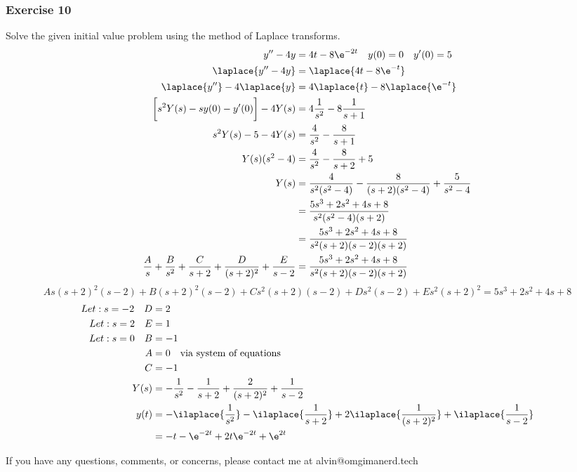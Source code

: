 \documentclass{math}
\begin{document}
\subsubsection*{Exercise 10}
Solve the given initial value problem using the method of Laplace transforms.
\begin{align*}
  y''-4y &= 4t-8\e^{-2t} \quad y(0) = 0 \quad y'(0) = 5 \\
  \laplace{y''-4y} &= \laplace{4t-8\e^{-t}} \\
  \laplace{y''}-4\laplace{y} &= 4\laplace{t}-8\laplace{\e^{-t}} \\
  \bigg[s^2Y(s)-sy(0)-y'(0)\bigg]-4Y(s) &= 4\frac{1}{s^2}-8\frac{1}{s+1} \\
  s^2Y(s)-5-4Y(s) &= \frac{4}{s^2}-\frac{8}{s+1} \\
  Y(s)(s^2-4) &= \frac{4}{s^2}-\frac{8}{s+2}+5 \\
  Y(s) &= \frac{4}{s^2(s^2-4)}-\frac{8}{(s+2)(s^2-4)}+\frac{5}{s^2-4} \\
  &= \frac{5s^3+2s^2+4s+8}{s^2(s^2-4)(s+2)} \\
  &= \frac{5s^3+2s^2+4s+8}{s^2(s+2)(s-2)(s+2)} \\
  \frac{A}{s}+\frac{B}{s^2}+\frac{C}{s+2}+\frac{D}{(s+2)^2}+\frac{E}{s-2} &=
    \frac{5s^3+2s^2+4s+8}{s^2(s+2)(s-2)(s+2)} \\
\end{align*}
\[ As(s+2)^2(s-2)+B(s+2)^2(s-2)+Cs^2(s+2)(s-2)+Ds^2(s-2)+Es^2(s+2)^2 =
  5s^3+2s^2+4s+8\]
\begin{align*}
  Let: s = -2 \quad D &= 2 \\
  Let: s = 2 \quad E &= 1 \\
  Let: s = 0 \quad B &= -1 \\
  A &= 0 \quad \text{via system of equations}\\
  C &= -1 \\
  Y(s) &= -\frac{1}{s^2}-\frac{1}{s+2}+\frac{2}{(s+2)^2}+\frac{1}{s-2} \\
  y(t) &= -\ilaplace{\frac{1}{s^2}}-\ilaplace{\frac{1}{s+2}}+
    2\ilaplace{\frac{1}{(s+2)^2}}+ \ilaplace{\frac{1}{s-2}} \\
  &= -t-\e^{-2t}+2t\e^{-2t}+\e^{2t}
\end{align*}

\begin{center}
  If you have any questions, comments, or concerns, please contact me at
  alvin@omgimanerd.tech
\end{center}
\end{document}
